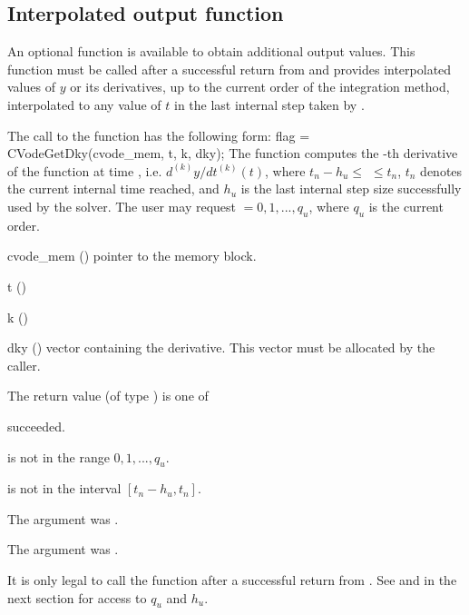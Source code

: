 \subsection{Interpolated output function}\label{ss:optional_dky}

An optional function  is available to obtain additional output
values.  This function must be called after a successful return from 
and provides interpolated values of $y$ or its derivatives, up to the current
order of the integration method, interpolated to any value of $t$ in the last
internal step taken by {\cvode}.

The call to the  function has the following form:
{
  flag = CVodeGetDky(cvode\_mem, t, k, dky);
}
{
  The function  computes the -th derivative of the 
  function at time , i.e. $d^{(k)}y/dt^{(k)} (t)$, where $t_n - h_u \le$
   $\le t_n$, $t_n$ denotes the current internal time reached, and $h_u$
  is the  last internal step size successfully used by the solver.  The 
  user may request  $= 0, 1, ..., q_u$, where $q_u$ is the current order. 
}
{
  \begin{args}
  \item[cvode\_mem] ()
    pointer to the {\cvode} memory block.
  \item[t] ()
  \item[k] ()
  \item[dky] ()
    vector containing the derivative.
    This vector must be allocated by the caller. 
  \end{args}
}
{
  The return value  (of type ) is one of
  \begin{args} 
  \item[\Id{CV\_SUCCESS}]
     succeeded.
  \item[\Id{CV\_BAD\_K}] 
     is not in the range $0, 1, ..., q_u$.
  \item[\Id{CV\_BAD\_T}] 
     is not in the interval $[t_n - h_u , t_n]$.
  \item[\Id{CV\_BAD\_DKY}] 
    The  argument was .
  \item[\Id{CV\_MEM\_NULL}] 
    The  argument was .
  \end{args}

}
{
  It is only legal to call the function  after a 
  successful return from . See  
  and  in the next section for access to 
  $q_u$ and $h_u$.
}

